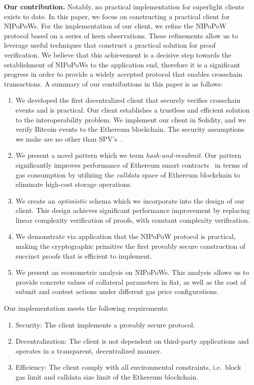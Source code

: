 \textbf{Our contribution.} Notably, no practical implementation for superlight
clients exists to date. In this paper, we focus on constructing a practical
client for NIPoPoWs. For the implementation of our client, we refine the
NIPoPoW protocol based on a series of keen observations. These refinements
allow us to leverage useful techniques that construct a practical solution for
proof verification. We believe that this achievement is a decisive step towards
the establishment of NIPoPoWs to the application end, therefore it is a
significant progress in order to provide a widely accepted protocol that
enables crosschain transactions. A summary of our contributions in this paper
is as follows:
\begin{enumerate}
\item We developed the first decentralized client that securely verifies
crosschain events and is practical. Our client establishes a trustless and
efficient solution to the interoperability problem. We implement our client
in Solidity, and we verify Bitcoin events to the Ethereum blockchain. The
security assumptions we make are no other than
SPV's~\cite{eclipse, eclipse-ethereum}.
\item We present a novel pattern which we term \emph{hash-and-resubmit}. Our
pattern significantly improves performance of Ethereum smart
contracts~\cite{wood, buterin} in terms of gas consumption by utilizing the
\emph{calldata} space of Ethereum blockchain to eliminate high-cost storage
operations.
\item We create an \emph{optimistic} schema which we incorporate into the design
of our client. This design achieves significant performance improvement by
replacing linear complexity verification of proofs, with constant complexity
verification.
\item We demonstrate via application that the NIPoPoW protocol is practical,
making the cryptographic primitive the first provably secure construction of
succinct proofs that is efficient to implement.
\item We present an econometric analysis on NIPoPoWs. This analysis allows us
to provide concrete values of collateral parameters in fiat, as well as the
cost of submit and contest actions under different gas price configurations.

\end{enumerate}

Our implementation meets the following requirements:
\begin{enumerate}
\item Security: The client implements a provably secure protocol.
\item Decentralization: The client is not dependent on third-party applications
and operates in a transparent, decentralized manner.
\item Efficiency: The client comply with all environmental constraints, i.e.\
block gas limit and calldata size limit of the Ethereum blockchain.
\end{enumerate}


